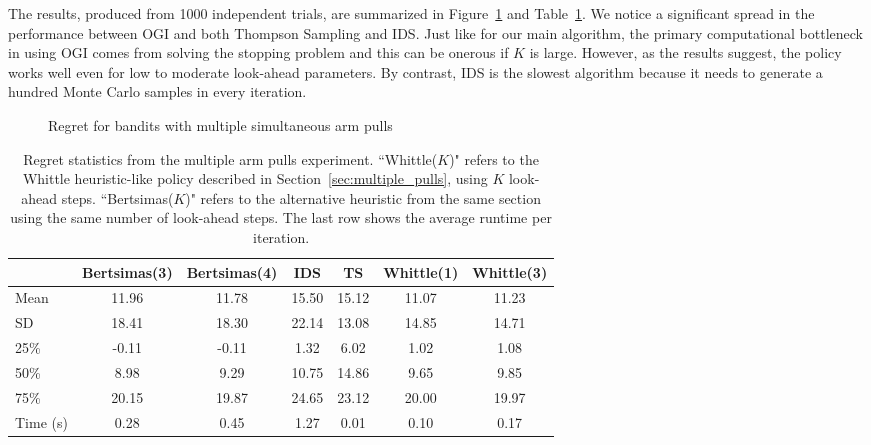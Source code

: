The results, produced from 1000 independent trials, are summarized in Figure~\ref{fig:restless1} and Table~\ref{table:restless1_summary}. We notice a significant spread in the performance between OGI and both Thompson Sampling and IDS. Just like for our main algorithm, the primary computational bottleneck in using OGI comes from solving the stopping problem and this can be onerous if $K$ is large. However, as the results suggest, the policy works well even for low to moderate look-ahead parameters. By contrast, IDS is the slowest algorithm because it needs to generate a hundred Monte Carlo samples in every iteration.
\begin{figure}
	\centering
	
	\caption{Regret for bandits with multiple simultaneous arm pulls}
	\label{fig:restless1}
\end{figure}

\begin{table}
	\centering
	\begin{tabular}{lcccccc}
		\toprule
		{} &  \textbf{Bertsimas(3)} &  \textbf{Bertsimas(4)} &   \textbf{IDS} &  \textbf{TS} &  \textbf{Whittle(1)} &  \textbf{Whittle(3)} \\
		\midrule
		Mean      &         11.96 &         11.78 & 15.50 &     15.12 &       11.07 &       11.23 \\
		SD       &         18.41 &         18.30 & 22.14 &     13.08 &       14.85 &       14.71 \\
		25\% &         -0.11 &         -0.11 &  1.32 &      6.02 &        1.02 &        1.08 \\
		50\%    &          8.98 &          9.29 & 10.75 &     14.86 &        9.65 &        9.85 \\
		75\% &         20.15 &         19.87 & 24.65 &     23.12 &       20.00 &       19.97 \\
		Time (s)  &          0.28 &          0.45 &  1.27 &      0.01 &        0.10 &        0.17 \\
		\bottomrule
	\end{tabular}
	
	\caption{Regret statistics from the multiple arm pulls experiment. ``Whittle($K$)" refers to the Whittle heuristic-like policy described in Section~\ref{sec:multiple_pulls}, using $K$ look-ahead steps. ``Bertsimas($K$)" refers to the alternative heuristic from the same section using the same number of look-ahead steps. The last row shows the average runtime per iteration.}
	\label{table:restless1_summary}
\end{table}